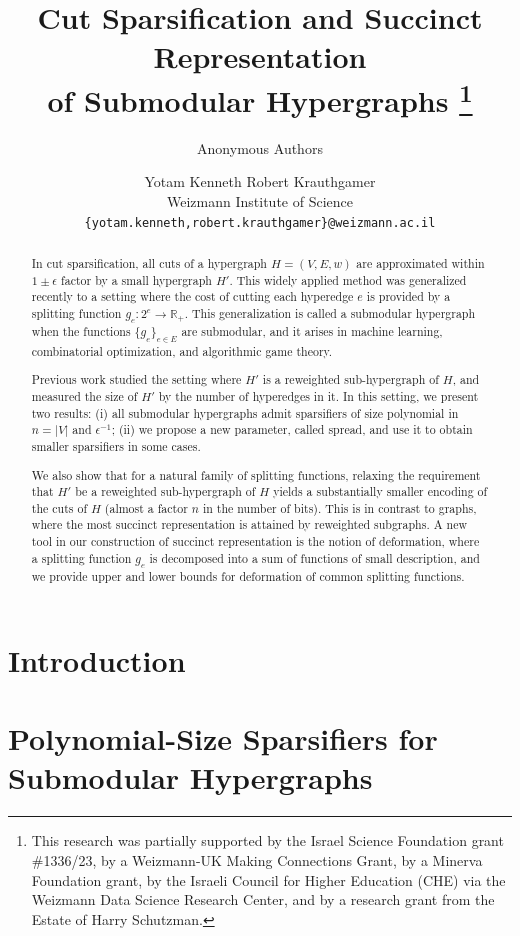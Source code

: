 \documentclass[11pt]{article}
\title{Cut Sparsification and Succinct Representation \\ of Submodular Hypergraphs%
  \ifanonym
  \else 
    \thanks{This research was partially supported 
      by the Israel Science Foundation grant \#1336/23, 
      by a Weizmann-UK Making Connections Grant,
      by a Minerva Foundation grant,
      by the Israeli Council for Higher Education (CHE) via the Weizmann Data Science Research Center,
      and by a research grant from the Estate of Harry Schutzman.
    }
  \fi
}
\author{Anonymous Authors}
\author{
  Yotam Kenneth 
  \qquad
  Robert Krauthgamer
  \\ Weizmann Institute of Science
  \\ \texttt{\{yotam.kenneth,robert.krauthgamer\}@weizmann.ac.il}
}
\newcommand{\R}{\mathbb{R}}
\begin{document}
\maketitle

\begin{abstract}
In cut sparsification, all cuts of a hypergraph $H=(V,E,w)$ are approximated
within $1\pm\epsilon$ factor by a small hypergraph $H'$.
This widely applied method was generalized recently 
to a setting where the cost of cutting each hyperedge $e$ is provided by a splitting function $g_e: 2^e\to\R_+$.
This generalization is called a submodular hypergraph
when the functions $\{g_e\}_{e\in E}$ are submodular,
and it arises in machine learning, combinatorial optimization, and algorithmic game theory.

Previous work studied the setting where $H'$ is a reweighted sub-hypergraph of $H$,
and measured the size of $H'$  by the number of hyperedges in it.
In this setting, we present two results:
(i) all submodular hypergraphs admit sparsifiers of size polynomial in $n=|V|$ and $\epsilon^{-1}$; 
(ii) we propose a new parameter, called spread, and use it to obtain smaller sparsifiers in some cases.

We also show that for a natural family of splitting functions, relaxing the requirement that $H'$ be a reweighted sub-hypergraph of $H$ yields a substantially smaller encoding of the cuts of $H$ (almost a factor $n$ in the number of bits).
This is in contrast to graphs, where
the most succinct representation is attained by reweighted subgraphs.
A new tool in our construction of succinct representation is the notion of deformation,
where a splitting function $g_e$ is decomposed into a sum of functions of small description,
and we provide upper and lower bounds for deformation of common splitting functions.
\end{abstract}


\newpage

\section{Introduction}
\label{sec:introduction}
%



\section{Polynomial-Size Sparsifiers for Submodular Hypergraphs}
\label{sec:polynomial-submodular-sparsifiers-proof}
%

\end{document}
